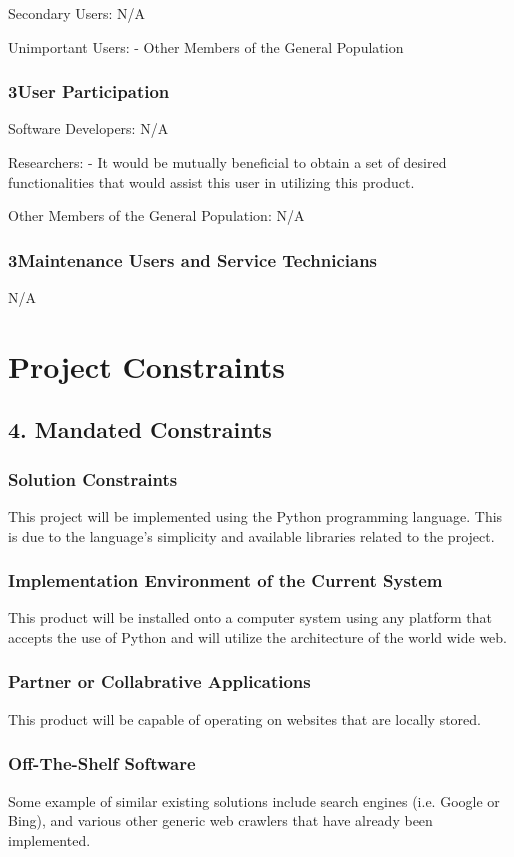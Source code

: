 \documentclass[titlepage]{article}
\begin{document}
Secondary Users:
N/A

Unimportant Users:
- Other Members of the General Population

\subsubsection*{3User Participation}
Software Developers:
N/A

Researchers:
- It would be mutually beneficial to obtain a set of desired functionalities that would assist this user in utilizing this product.

Other Members of the General Population:
N/A

\subsubsection*{3Maintenance Users and Service Technicians}
N/A


\section{Project Constraints}

\subsection{4. Mandated Constraints}

\subsubsection*{Solution Constraints}
	This project will be implemented using the Python programming language. This is due to the language’s simplicity and available libraries related to the project.

\subsubsection*{Implementation Environment of the Current System}
This product will be installed onto a computer system using any platform that accepts the use of Python and will utilize the architecture of the world wide web.

\subsubsection*{Partner or Collabrative Applications}
This product will be capable of operating on websites that are locally stored.

\subsubsection*{Off-The-Shelf Software}
Some example of similar existing solutions include search engines (i.e. Google or Bing), and various other generic web crawlers that have already been implemented.
\end{document}
